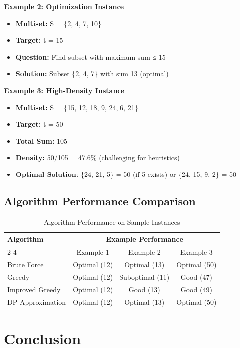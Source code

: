 \documentclass[12pt,a4paper]{article}
\begin{document}
\textbf{Example 2: Optimization Instance}
\begin{itemize}
\item \textbf{Multiset:} S = \{2, 4, 7, 10\}
\item \textbf{Target:} t = 15
\item \textbf{Question:} Find subset with maximum sum ≤ 15
\item \textbf{Solution:} Subset \{2, 4, 7\} with sum 13 (optimal)
\end{itemize}

\textbf{Example 3: High-Density Instance}
\begin{itemize}
\item \textbf{Multiset:} S = \{15, 12, 18, 9, 24, 6, 21\}
\item \textbf{Target:} t = 50
\item \textbf{Total Sum:} 105
\item \textbf{Density:} 50/105 = 47.6\% (challenging for heuristics)
\item \textbf{Optimal Solution:} \{24, 21, 5\} = 50 (if 5 exists) or \{24, 15, 9, 2\} = 50
\end{itemize}

\subsection{Algorithm Performance Comparison}

\begin{table}[H]
\centering
\begin{tabular}{@{}lccc@{}}
\toprule
\multirow{2}{*}{Algorithm} & \multicolumn{3}{c}{Example Performance} \\
\cmidrule(l){2-4}
 & Example 1 & Example 2 & Example 3 \\
\midrule
Brute Force & Optimal (12) & Optimal (13) & Optimal (50) \\
Greedy & Optimal (12) & Suboptimal (11) & Good (47) \\
Improved Greedy & Optimal (12) & Good (13) & Good (49) \\
DP Approximation & Optimal (12) & Optimal (13) & Optimal (50) \\
\bottomrule
\end{tabular}
\caption{Algorithm Performance on Sample Instances}
\end{table}

\section{Conclusion}
\end{document}
